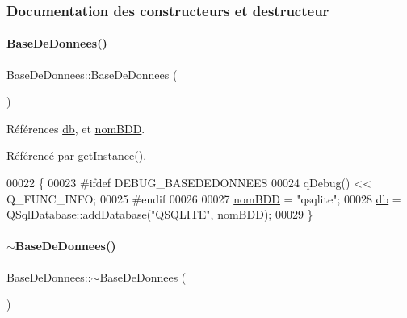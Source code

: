\subsubsection{Documentation des constructeurs et destructeur}
\mbox{\label{class_base_de_donnees_ac4d0c514f439b3a19dc35c159955373a}} 
\paragraph{\texorpdfstring{Base\+De\+Donnees()}{BaseDeDonnees()}}
{\footnotesize\ttfamily Base\+De\+Donnees\+::\+Base\+De\+Donnees (\begin{DoxyParamCaption}{ }\end{DoxyParamCaption})\hspace{0.3cm}{\ttfamily [private]}}



Références \hyperlink{class_base_de_donnees_a3e738dcf443370c46a541677ab619f06}{db}, et \hyperlink{class_base_de_donnees_a67c1d973c267a8f5fd6d7461550faa11}{nom\+B\+DD}.



Référencé par \hyperlink{class_base_de_donnees_a1cea5a739386ba076c7f265205e82608}{get\+Instance()}.


\begin{DoxyCode}
00022 \{
00023 \textcolor{preprocessor}{    #ifdef DEBUG\_BASEDEDONNEES}
00024     qDebug() << Q\_FUNC\_INFO;
00025 \textcolor{preprocessor}{    #endif}
00026 
00027     \hyperlink{class_base_de_donnees_a67c1d973c267a8f5fd6d7461550faa11}{nomBDD} = \textcolor{stringliteral}{"qsqlite"};
00028     \hyperlink{class_base_de_donnees_a3e738dcf443370c46a541677ab619f06}{db} = QSqlDatabase::addDatabase(\textcolor{stringliteral}{"QSQLITE"}, \hyperlink{class_base_de_donnees_a67c1d973c267a8f5fd6d7461550faa11}{nomBDD});
00029 \}
\end{DoxyCode}
\mbox{\label{class_base_de_donnees_a5dc474cdbe003644fb0ca7b8f2ec6b93}} 
\paragraph{\texorpdfstring{$\sim$\+Base\+De\+Donnees()}{~BaseDeDonnees()}}
{\footnotesize\ttfamily Base\+De\+Donnees\+::$\sim$\+Base\+De\+Donnees (\begin{DoxyParamCaption}{ }\end{DoxyParamCaption})\hspace{0.3cm}{\ttfamily [private]}}


